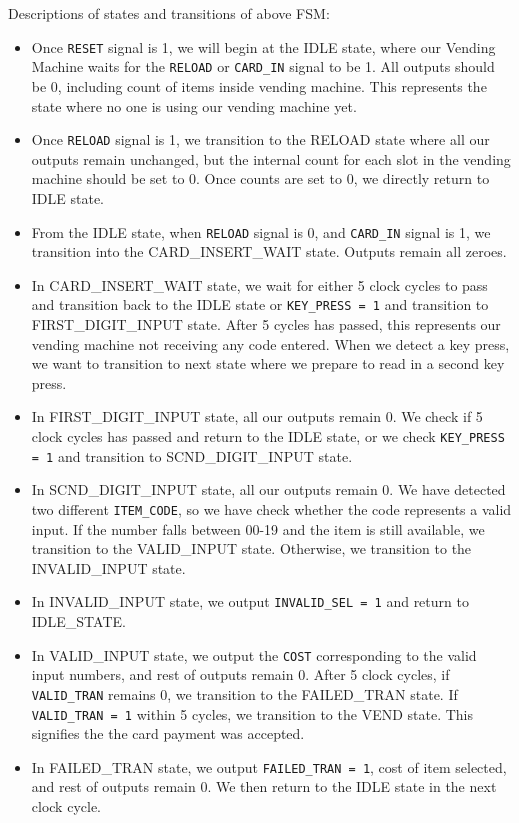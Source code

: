 \documentclass{article}
\begin{document}
Descriptions of states and transitions of above FSM:
\begin{itemize}
    \item Once \texttt{RESET} signal is 1, we will begin at the IDLE state, where our Vending Machine waits for the \texttt{RELOAD} or \texttt{CARD\_IN} signal to be 1. All outputs should be 0, including count of items inside vending machine. This represents the state where no one is using our vending machine yet.
    \item Once \texttt{RELOAD} signal is 1, we transition to the RELOAD state where all our outputs remain unchanged, but the internal count for each slot in the vending machine should be set to 0. Once counts are set to 0, we directly return to IDLE state.
    \item From the IDLE state, when \texttt{RELOAD} signal is 0, and \texttt{CARD\_IN} signal is 1, we transition into the CARD\_INSERT\_WAIT state. Outputs remain all zeroes. 
    \item In CARD\_INSERT\_WAIT state, we wait for either 5 clock cycles to pass and transition back to the IDLE state or \texttt{KEY\_PRESS = 1} and transition to FIRST\_DIGIT\_INPUT state.  After 5 cycles has passed, this represents our vending machine not receiving any code entered. When we detect a key press, we want to transition to next state where we prepare to read in a second key press.
    \item In FIRST\_DIGIT\_INPUT state, all our outputs remain 0. We check if 5 clock cycles has passed and return to the IDLE state, or we check \texttt{KEY\_PRESS = 1} and transition to SCND\_DIGIT\_INPUT state. 
    \item In SCND\_DIGIT\_INPUT state, all our outputs remain 0. We have detected two different \texttt{ITEM\_CODE}, so we have check whether the code represents a valid input. If the number falls between 00-19 and the item is still available, we transition to the VALID\_INPUT state. Otherwise, we transition to the INVALID\_INPUT state. 
    \item In INVALID\_INPUT state, we output \texttt{INVALID\_SEL = 1} and return to IDLE\_STATE.
    \item In VALID\_INPUT state, we output the \texttt{COST} corresponding to the valid input numbers, and rest of outputs remain 0. After 5 clock cycles, if \texttt{VALID\_TRAN} remains 0, we transition to the FAILED\_TRAN state. If \texttt{VALID\_TRAN = 1} within 5 cycles, we transition to the VEND state. This signifies the the card payment was accepted. 
    \item In FAILED\_TRAN state, we output \texttt{FAILED\_TRAN = 1}, cost of item selected, and rest of outputs remain 0. We then return to the IDLE state in the next clock cycle.

\end{itemize}
\end{document}
